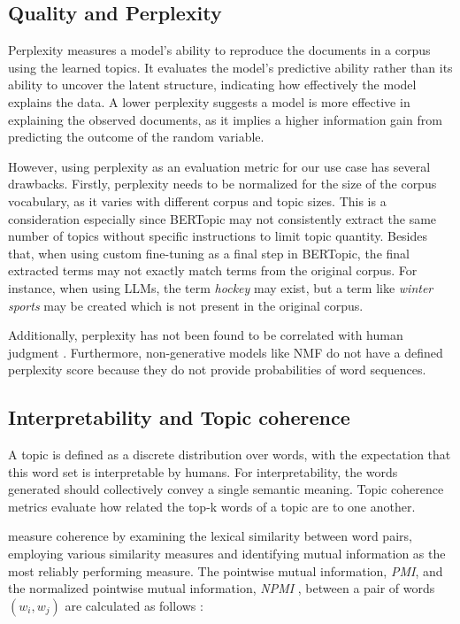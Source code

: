 \subsection{Quality and Perplexity}

Perplexity measures a model's ability to reproduce the documents in a corpus using the learned topics. It evaluates the model's predictive ability rather than its ability to uncover the latent structure, indicating how effectively the model explains the data. A lower perplexity suggests a model is more effective in explaining the observed documents, as it implies a higher information gain from predicting the outcome of the random variable.

However, using perplexity as an evaluation metric for our use case has several drawbacks. Firstly, perplexity needs to be normalized for the size of the corpus vocabulary, as it varies with different corpus and topic sizes. This is a consideration especially since BERTopic may not consistently extract the same number of topics without specific instructions to limit topic quantity. Besides that, when using custom fine-tuning as a final step in BERTopic, the final extracted terms may not exactly match terms from the original corpus. For instance, when using LLMs, the term \textit{hockey} may exist, but a term like \textit{winter sports} may be created which is not present in the original corpus.

Additionally, perplexity has not been found to be correlated with human judgment \cite{chang_reading_2009}. Furthermore, non-generative models like NMF do not have a defined perplexity score because they do not provide probabilities of word sequences.

\subsection{Interpretability and Topic coherence}
\label{sec:topic_coherence}

A topic is defined as a discrete distribution over words, with the expectation that this word set is interpretable by humans. For interpretability, the words generated should collectively convey a single semantic meaning. Topic coherence metrics evaluate how related the top-k words of a topic are to one another.

\citet{newman_automatic_2010} measure coherence by examining the lexical similarity between word pairs, employing various similarity measures and identifying mutual information as the most reliably performing measure. The pointwise mutual information, \textit{PMI}, and the normalized pointwise mutual information, \textit{NPMI} \cite{bouma_normalized_nodate}, between a pair of words $(w_i, w_j)$ are calculated as follows \cite{lau_machine_2014}:

